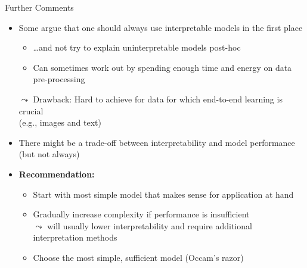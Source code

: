 \documentclass[11pt,compress,t,notes=noshow, aspectratio=169, xcolor=table]{beamer}
\begin{document}
\begin{frame}{Further Comments}

    \begin{itemize}
    \itemsep1em
        \item Some argue that one should always use interpretable models in the first place 
        \begin{itemize}
            \item \ldots and not try to explain uninterpretable models post-hoc
            \item Can sometimes work out by spending enough time and energy on data pre-processing %
        \end{itemize}
        \pause
       \item[$\leadsto$] Drawback: Hard to achieve for data for which end-to-end learning is crucial\\ (e.g., images and text)
        \pause
        \item There might be a trade-off between interpretability and model performance (but not always)
        \pause
        \item \textbf{Recommendation:}
        \begin{itemize}
            \item Start with most simple model that makes sense for application at hand
            \item Gradually increase complexity if performance is insufficient\\
            $\leadsto$ will usually lower interpretability and require additional interpretation methods
            \item Choose the most simple, sufficient model (Occam's razor)
        \end{itemize} 
    \end{itemize}

\end{frame}


\endlecture
\end{document}
